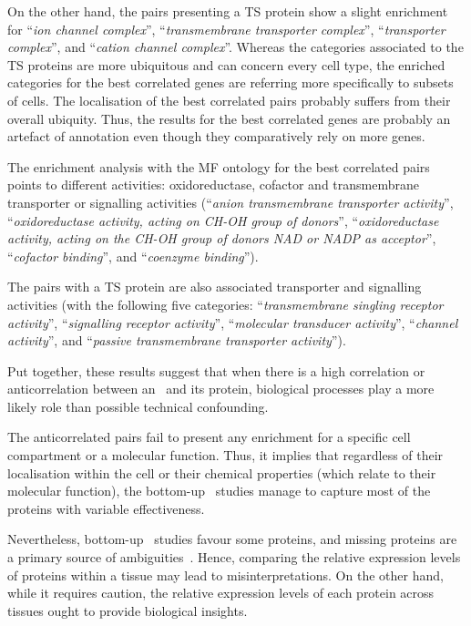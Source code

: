 On the other hand, the pairs presenting a \gls{TS} protein
show a slight enrichment for
\enquote{\textit{ion channel complex}},
\enquote{\textit{transmembrane transporter complex}},
\enquote{\textit{transporter complex}},
and \enquote{\textit{cation channel complex}}.
Whereas the categories associated to the \gls{TS} proteins
are more ubiquitous and can concern every cell type,
the enriched categories for the best correlated genes
are referring more specifically to subsets of cells.
The localisation of the best correlated pairs probably suffers
from their overall ubiquity.
Thus, the results for the best correlated genes are probably an artefact
of annotation
even though they comparatively rely on more genes.\mybr\

The enrichment analysis with the MF ontology
for the best correlated pairs points to different activities:
oxidoreductase, cofactor and transmembrane transporter or signalling activities
(\enquote{\textit{anion transmembrane transporter activity}},
\enquote{\textit{oxidoreductase activity, acting on CH-OH group of donors}},
\enquote{\textit{oxidoreductase activity, acting on the CH-OH group of donors
NAD or NADP as acceptor}},
\enquote{\textit{cofactor binding}},
and \enquote{\textit{coenzyme binding}}).\mybr\

The pairs with a \gls{TS} protein are also associated
transporter and signalling activities
(with the following five categories:
\enquote{\textit{transmembrane singling receptor activity}},
\enquote{\textit{signalling receptor activity}},
\enquote{\textit{molecular transducer activity}},
\enquote{\textit{channel activity}},
and \enquote{\textit{passive transmembrane transporter activity}}).\mybr\

Put together, these results suggest that
when there is a high correlation or anticorrelation between an \mRNA\ and its protein,
biological processes play a more likely role than possible technical confounding.\mybr\

The anticorrelated pairs fail to present any enrichment
for a specific cell compartment or a molecular function.
Thus, it implies that
regardless of their localisation within the cell
or their chemical properties (which relate to their molecular function),
the bottom-up \ms\ studies manage to capture most of the proteins
with variable effectiveness.\mybr\

Nevertheless, bottom-up \ms\ studies favour some proteins,
and missing proteins are a primary source of ambiguities~.
Hence, comparing the relative expression levels of proteins within a tissue
may lead to misinterpretations.
On the other hand, while it requires caution,
the relative expression levels of each protein across tissues
ought to provide biological insights.\mybr\


